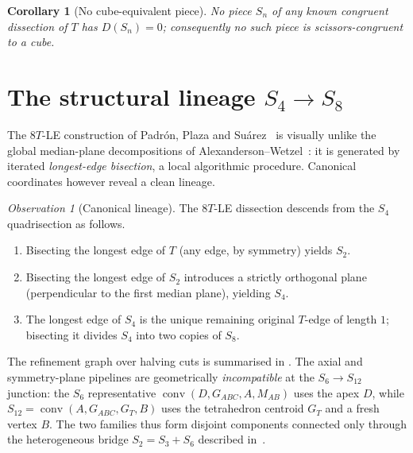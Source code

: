 \documentclass[11pt,a4paper]{article}
\theoremstyle{plain}
\newtheorem{corollary}[corollary]{Corollary}
\theoremstyle{definition}
\theoremstyle{remark}
\newtheorem{observation}[observation]{Observation}
\DeclareMathOperator{\conv}{conv}
\begin{document}
\begin{corollary}[No cube-equivalent piece]\label{cor:nocube}
No piece $S_{n}$ of any known congruent dissection of $T$ has $D(S_{n}) = 0$;
consequently no such piece is scissors-congruent to a cube.
\end{corollary}

\section{The structural lineage \texorpdfstring{$S_{4} \to S_{8}$}{S4->S8}}
\label{sec:poset}

The $8T$-LE construction of Padr\'on, Plaza and Su\'arez~\cite{PPS2023} is
visually unlike the global median-plane decompositions of
Alexanderson--Wetzel~\cite{AW1971}: it is generated by iterated
\emph{longest-edge bisection}, a local algorithmic procedure.  Canonical
coordinates however reveal a clean lineage.

\begin{observation}[Canonical lineage]\label{obs:s4-s8}
The $8T$-LE dissection descends from the $S_{4}$ quadrisection as follows.
\begin{enumerate}
  \item Bisecting the longest edge of $T$ (any edge, by symmetry) yields $S_{2}$.
  \item Bisecting the longest edge of $S_{2}$ introduces a strictly orthogonal
        plane (perpendicular to the first median plane), yielding $S_{4}$.
  \item The longest edge of $S_{4}$ is the unique remaining original $T$-edge
        of length $1$; bisecting it divides $S_{4}$ into two copies of $S_{8}$.
\end{enumerate}
\end{observation}

The refinement graph over halving cuts is summarised in
.  The axial and symmetry-plane pipelines are
geometrically \emph{incompatible} at the $S_{6} \to S_{12}$ junction: the
$S_{6}$ representative $\conv(D,G_{ABC},A,M_{AB})$ uses the apex $D$, while
$S_{12} = \conv(A,G_{ABC},G_{T},B)$ uses the tetrahedron centroid $G_{T}$ and
a fresh vertex $B$.  The two families thus form disjoint components
connected only through the heterogeneous bridge $S_{2} = S_{3} + S_{6}$
described in~.
\end{document}
